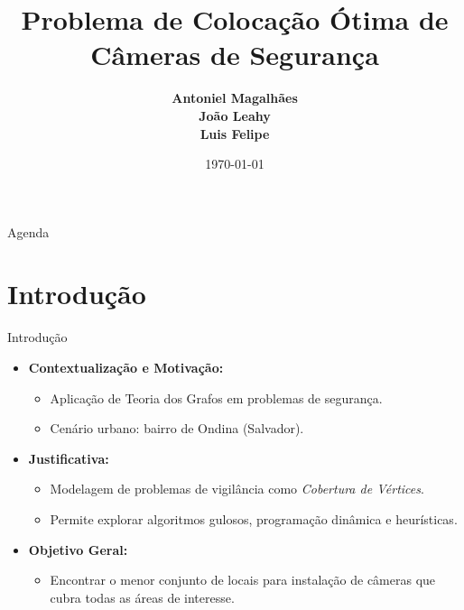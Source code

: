 \documentclass[aspectratio=169,xcolor=table]{beamer}
\author[Magalhães, Leahy, Felipe]{%
  \textbf{Antoniel Magalhães} \\
  \textbf{João Leahy } \\
  \textbf{Luis Felipe}
}
\title{Problema de Colocação Ótima de Câmeras de Segurança}
\institute{Universidade Federal da Bahia \\ Instituto de Computação}
\date{\today}
\begin{document}
\begin{frame}
    \titlepage
\end{frame}

\begin{frame}{Agenda}
    \tableofcontents
\end{frame}

\section{Introdução}
\begin{frame}{Introdução}
    \begin{itemize}
        \item \textbf{Contextualização e Motivação:}
        \begin{itemize}
            \item Aplicação de Teoria dos Grafos em problemas de segurança.
            \item Cenário urbano: bairro de Ondina (Salvador).
        \end{itemize}
        \item \textbf{Justificativa:}
        \begin{itemize}
            \item Modelagem de problemas de vigilância como \emph{Cobertura de Vértices}.
            \item Permite explorar algoritmos gulosos, programação dinâmica e heurísticas.
        \end{itemize}
        \item \textbf{Objetivo Geral:}
        \begin{itemize}
            \item Encontrar o menor conjunto de locais para instalação de câmeras que cubra todas as áreas de interesse.
        \end{itemize}
    \end{itemize}
\end{frame}

\end{document}
